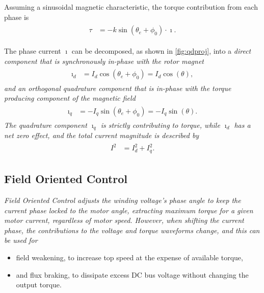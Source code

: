 \documentclass[12pt,a4paper,oneside,openany]{article}
\begin{document}
Assuming a sinusoidal magnetic characteristic, the torque contribution from each phase is
\begin{gather}
\begin{aligned}
\tau &= - k \sin \left( \theta_e + \phi_{0}\right) \cdot \imath.
\end{aligned}
\end{gather}

The phase current $\imath$ can be decomposed, as shown in \cref{fig:qdproj}, into a \em direct \em component that is synchronously in-phase with the rotor magnet
\begin{gather}
\begin{aligned}
\imath_d &= I_d \cos \left( \theta_e + \phi_{0}\right) = I_d \cos \left( \theta \right),
\end{aligned}
\end{gather}
and an orthogonal \em quadrature \em component that is in-phase with the torque producing component of the magnetic field
\begin{gather}
\begin{aligned}
\imath_q &= - I_q \sin \left( \theta_e + \phi_{0}\right) = - I_q \sin \left( \theta \right).
\end{aligned}
\end{gather}
The quadrature component $\imath_q$ is strictly contributing to torque, while $\imath_d$ has a net zero effect, and the total current magnitude is described by
\begin{gather}
\begin{aligned}
I^2 &= I_d^2 + I_q^2.
\end{aligned}
\end{gather}

\subsection{Field Oriented Control}

\em Field Oriented Control \em adjusts the winding voltage's phase angle to keep the current phase locked to the motor angle, extracting maximum torque for a given motor current, regardless of motor speed. However, when shifting the current phase, the contributions to the voltage and torque waveforms change, and this can be used for
\begin{itemize}
\item field weakening, to increase top speed at the expense of available torque,
\item and flux braking, to dissipate excess DC bus voltage without changing the output torque.
\end{itemize}
\end{document}
